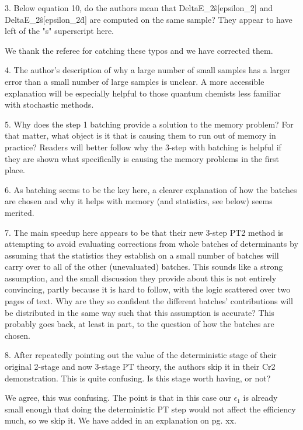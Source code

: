 \documentclass[
preprint,
onecolumn,
 superscriptaddress,
 amsmath,amssymb,
 aps,
]{revtex4-1}
\begin{document}
\vskip 5mm {\color{blue}
3. Below equation 10, do the authors mean that DeltaE\_2\^s[epsilon\_2] and
DeltaE\_2\^s[epsilon\_2\^d] are computed on the same sample? They appear to have left of the
"s" superscript here.
}\color{black}

We thank the referee for catching these typos and we have corrected them.

\vskip 5mm {\color{blue}
4. The author's description of why a large number of small samples has a larger error than
a small number of large samples is unclear. A more accessible explanation will be especially
helpful to those quantum chemists less familiar with stochastic methods.
}\color{black}

\vskip 5mm {\color{blue}
5. Why does the step 1 batching provide a solution to the memory problem? For that matter,
what object is it that is causing them to run out of memory in practice? Readers will better
follow why the 3-step with batching is helpful if they are shown what specifically is causing
the memory problems in the first place.
}\color{black}

\vskip 5mm {\color{blue}
6. As batching seems to be the key here, a clearer explanation of how the batches are chosen
and why it helps with memory (and statistics, see below) seems merited.
}\color{black}

\vskip 5mm {\color{blue}
7. The main speedup here appears to be that their new 3-step PT2 method is attempting to avoid
evaluating corrections from whole batches of determinants by assuming that the statistics
they establish on a small number of batches will carry over to all of the other (unevaluated)
batches. This sounds like a strong assumption, and the small discussion they provide about
this is not entirely convincing, partly because it is hard to follow, with the logic scattered
over two pages of text. Why are they so confident the different batches' contributions will
be distributed in the same way such that this assumption is accurate? This probably goes back,
at least in part, to the question of how the batches are chosen.
}\color{black}

\vskip 5mm {\color{blue}
8. After repeatedly pointing out the value of the deterministic stage of their original
2-stage and now 3-stage PT theory, the authors skip it in their Cr2 demonstration. This is
quite confusing. Is this stage worth having, or not?
}\color{black}

We agree, this was confusing.  The point is that in this case our $\epsilon_1$ is already
small enough that doing the deterministic PT step would not affect the efficiency much,
so we skip it.  We have added in an explanation on pg. xx.
\end{document}
